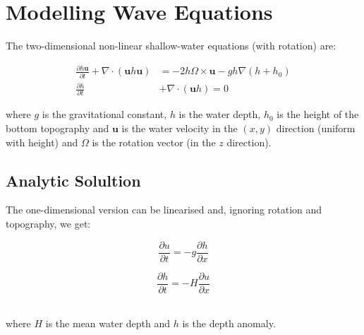\chapter{Modelling Wave Equations}

The two-dimensional non-linear shallow-water equations (with rotation) are:

\begin{minipage}{0.68\linewidth}
\begin{align}
\frac{\partial h\mathbf{u}}{\partial t} + \nabla\cdot(\mathbf{u}h\mathbf{u} )&= 
-2h\Omega\times\mathbf{u} - gh \nabla (h+h_0) \label{eqn:SWEuv}\\
\frac{\partial h}{\partial t} & + \nabla\cdot(\mathbf{u}h) = 0 \label{eqn:SWEh}
\end{align}
\end{minipage}
\hfill
\begin{minipage}{0.3\linewidth}

\end{minipage}

where $g$ is the gravitational constant, $h$ is the water depth, $h_0$ is the height of the bottom topography and $\mathbf{u}$ is the water velocity in the $(x,y)$ direction (uniform with height) and $\Omega$ is the rotation vector (in the $z$ direction). 

\section{Analytic Solultion}

The one-dimensional version can be linearised and, ignoring rotation and topography, we get:\\
\begin{minipage}{0.49\linewidth}\centering
\begin{equation}
\frac{\partial u}{\partial t} = -g \frac{\partial h}{\partial x}
\label{eqn:SWEu}
\end{equation}
\end{minipage}
\begin{minipage}{0.49\linewidth}\centering
\begin{equation}
\frac{\partial h}{\partial t} = -H \frac{\partial u}{\partial x}
\label{eqn:SWEH}
\end{equation}
\end{minipage}\\
where $H$ is the mean water depth and $h$ is the depth anomaly.

